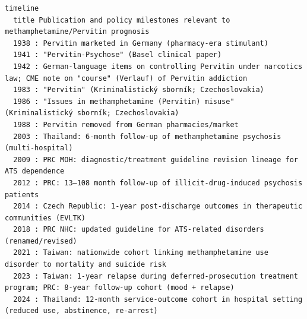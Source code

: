 \begin{verbatim}
timeline
  title Publication and policy milestones relevant to methamphetamine/Pervitin prognosis
  1938 : Pervitin marketed in Germany (pharmacy-era stimulant)
  1941 : "Pervitin-Psychose" (Basel clinical paper)
  1942 : German-language items on controlling Pervitin under narcotics law; CME note on "course" (Verlauf) of Pervitin addiction
  1983 : "Pervitin" (Kriminalistický sborník; Czechoslovakia)
  1986 : "Issues in methamphetamine (Pervitin) misuse" (Kriminalistický sborník; Czechoslovakia)
  1988 : Pervitin removed from German pharmacies/market
  2003 : Thailand: 6-month follow-up of methamphetamine psychosis (multi-hospital)
  2009 : PRC MOH: diagnostic/treatment guideline revision lineage for ATS dependence
  2012 : PRC: 13–108 month follow-up of illicit-drug-induced psychosis patients
  2014 : Czech Republic: 1-year post-discharge outcomes in therapeutic communities (EVLTK)
  2018 : PRC NHC: updated guideline for ATS-related disorders (renamed/revised)
  2021 : Taiwan: nationwide cohort linking methamphetamine use disorder to mortality and suicide risk
  2023 : Taiwan: 1-year relapse during deferred-prosecution treatment program; PRC: 8-year follow-up cohort (mood + relapse)
  2024 : Thailand: 12-month service-outcome cohort in hospital setting (reduced use, abstinence, re-arrest)
\end{verbatim}
